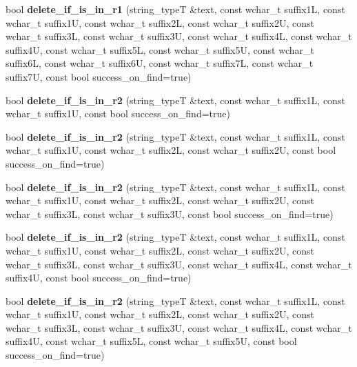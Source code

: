 \begin{DoxyCompactItemize}
\item 
bool {\bfseries delete\+\_\+if\+\_\+is\+\_\+in\+\_\+r1} (string\+\_\+typeT \&text, const wchar\+\_\+t suffix1L, const wchar\+\_\+t suffix1U, const wchar\+\_\+t suffix2L, const wchar\+\_\+t suffix2U, const wchar\+\_\+t suffix3L, const wchar\+\_\+t suffix3U, const wchar\+\_\+t suffix4L, const wchar\+\_\+t suffix4U, const wchar\+\_\+t suffix5L, const wchar\+\_\+t suffix5U, const wchar\+\_\+t suffix6L, const wchar\+\_\+t suffix6U, const wchar\+\_\+t suffix7L, const wchar\+\_\+t suffix7U, const bool success\+\_\+on\+\_\+find=true)\label{classstemming_1_1stem_acdf0457bd3392f1ac23dadef5515cebd}

\item 
bool {\bfseries delete\+\_\+if\+\_\+is\+\_\+in\+\_\+r2} (string\+\_\+typeT \&text, const wchar\+\_\+t suffix1L, const wchar\+\_\+t suffix1U, const bool success\+\_\+on\+\_\+find=true)\label{classstemming_1_1stem_a722e75e6404934da2f0c9c00ffded48a}

\item 
bool {\bfseries delete\+\_\+if\+\_\+is\+\_\+in\+\_\+r2} (string\+\_\+typeT \&text, const wchar\+\_\+t suffix1L, const wchar\+\_\+t suffix1U, const wchar\+\_\+t suffix2L, const wchar\+\_\+t suffix2U, const bool success\+\_\+on\+\_\+find=true)\label{classstemming_1_1stem_a33bf1854d1748ba97e30ad798f828b0e}

\item 
bool {\bfseries delete\+\_\+if\+\_\+is\+\_\+in\+\_\+r2} (string\+\_\+typeT \&text, const wchar\+\_\+t suffix1L, const wchar\+\_\+t suffix1U, const wchar\+\_\+t suffix2L, const wchar\+\_\+t suffix2U, const wchar\+\_\+t suffix3L, const wchar\+\_\+t suffix3U, const bool success\+\_\+on\+\_\+find=true)\label{classstemming_1_1stem_ac78dd58f01ed17a41eedc33d5b2deedb}

\item 
bool {\bfseries delete\+\_\+if\+\_\+is\+\_\+in\+\_\+r2} (string\+\_\+typeT \&text, const wchar\+\_\+t suffix1L, const wchar\+\_\+t suffix1U, const wchar\+\_\+t suffix2L, const wchar\+\_\+t suffix2U, const wchar\+\_\+t suffix3L, const wchar\+\_\+t suffix3U, const wchar\+\_\+t suffix4L, const wchar\+\_\+t suffix4U, const bool success\+\_\+on\+\_\+find=true)\label{classstemming_1_1stem_a3a79fd0ac96d009d0c93f1bec847c2ff}

\item 
bool {\bf delete\+\_\+if\+\_\+is\+\_\+in\+\_\+r2} (string\+\_\+typeT \&text, const wchar\+\_\+t suffix1L, const wchar\+\_\+t suffix1U, const wchar\+\_\+t suffix2L, const wchar\+\_\+t suffix2U, const wchar\+\_\+t suffix3L, const wchar\+\_\+t suffix3U, const wchar\+\_\+t suffix4L, const wchar\+\_\+t suffix4U, const wchar\+\_\+t suffix5L, const wchar\+\_\+t suffix5U, const bool success\+\_\+on\+\_\+find=true)\label{classstemming_1_1stem_a222f7af1124d34e58b3c38fa4b2ee669}


\end{DoxyCompactItemize}
